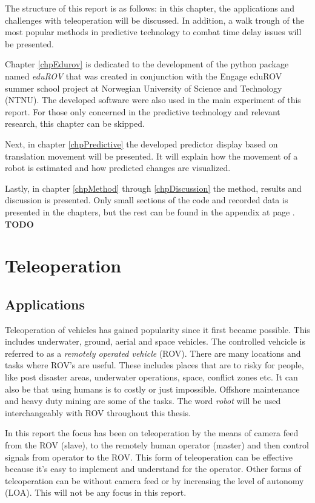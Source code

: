 The structure of this report is as follows: in this chapter, the applications and challenges with teleoperation will be discussed. In addition, a walk trough of the most popular methods in predictive technology to combat time delay issues will be presented.

Chapter \ref{chpEdurov} is dedicated to the development of the python package named \textit{eduROV} that was created in conjunction with the Engage eduROV summer school project at Norwegian University of Science and Technology (NTNU). The developed software were also used in the main experiment of this report. For those only concerned in the predictive technology and relevant research, this chapter can be skipped.

Next, in chapter \ref{chpPredictive} the developed predictor display based on translation movement will be presented. It will explain how the movement of a robot is estimated and how predicted changes are visualized.

Lastly, in chapter \ref{chpMethod} through \ref{chpDiscussion} the method, results and discussion is presented. Only small sections of the code and recorded data is presented in the chapters, but the rest can be found in the appendix at page \pageref{appendix}. \textbf{TODO}

\section{Teleoperation}


\subsection{Applications}
Teleoperation of vehicles has gained popularity since it first became possible. This includes underwater, ground, aerial and space vehicles. The controlled vehcicle is referred to as a \emph{remotely operated vehicle} (ROV). There are many locations and tasks where ROV's are useful. These includes places that are to risky for people, like post disaster areas, underwater operations, space, conflict zones etc. It can also be that using humans is to costly or just impossible. Offshore maintenance and heavy duty mining are some of the tasks. The word \emph{robot} will be used interchangeably with ROV throughout this thesis.

In this report the focus has been on teleoperation by the means of camera feed from the ROV (slave), to the remotely human operator (master) and then control signals from operator to the ROV. This form of teleoperation can be effective because it's easy to implement and understand for the operator. Other forms of teleoperation can be without camera feed or by increasing the level of autonomy (LOA). This will not be any focus in this report.

